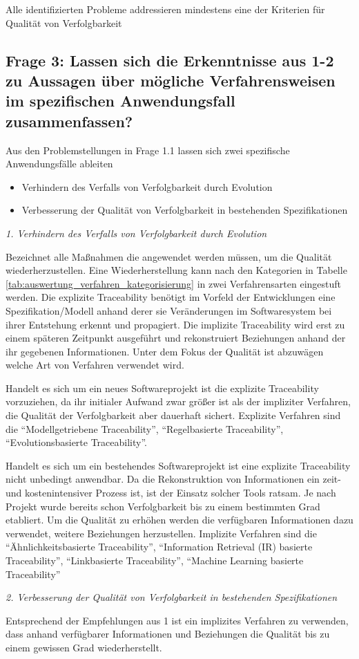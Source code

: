 Alle identifizierten Probleme addressieren mindestens eine der Kriterien für Qualität von Verfolgbarkeit

\subsection{Frage 3: Lassen sich die Erkenntnisse aus 1-2 zu Aussagen über mögliche Verfahrensweisen im spezifischen Anwendungsfall zusammenfassen?}

Aus den Problemstellungen in Frage 1.1 lassen sich zwei spezifische Anwendungsfälle ableiten

\begin{itemize}
    \item Verhindern des Verfalls von Verfolgbarkeit durch Evolution
    \item Verbesserung der Qualität von Verfolgbarkeit in bestehenden Spezifikationen
\end{itemize}

\textit{1. Verhindern des Verfalls von Verfolgbarkeit durch Evolution}

Bezeichnet alle Maßnahmen die angewendet werden müssen, um die Qualität wiederherzustellen. Eine Wiederherstellung kann nach den Kategorien in Tabelle \ref{tab:auswertung_verfahren_kategorisierung} in zwei Verfahrensarten eingestuft werden. Die explizite Traceability benötigt im Vorfeld der Entwicklungen eine Spezifikation/Modell anhand derer sie Veränderungen im Softwaresystem bei ihrer Entstehung erkennt und propagiert. Die implizite Traceability wird erst zu einem späteren Zeitpunkt ausgeführt und rekonstruiert Beziehungen anhand der ihr gegebenen Informationen. Unter dem Fokus der Qualität ist abzuwägen welche Art von Verfahren verwendet wird.

Handelt es sich um ein neues Softwareprojekt ist die explizite Traceability vorzuziehen, da ihr initialer Aufwand zwar größer ist als der impliziter Verfahren, die Qualität der Verfolgbarkeit aber dauerhaft sichert. Explizite Verfahren sind die \enquote{Modellgetriebene Traceability}, \enquote{Regelbasierte Traceability}, \enquote{Evolutionsbasierte Traceability}.

Handelt es sich um ein bestehendes Softwareprojekt ist eine explizite Traceability nicht unbedingt anwendbar. Da die Rekonstruktion von Informationen ein zeit- und kostenintensiver Prozess ist, ist der Einsatz solcher Tools ratsam. Je nach Projekt wurde bereits schon Verfolgbarkeit bis zu einem bestimmten Grad etabliert. Um die Qualität zu erhöhen werden die verfügbaren Informationen dazu verwendet, weitere Beziehungen herzustellen. Implizite Verfahren sind die \enquote{Ähnlichkeitsbasierte Traceability}, \enquote{Information Retrieval (IR) basierte Traceability}, \enquote{Linkbasierte Traceability}, \enquote{Machine Learning basierte Traceability}

\textit{2. Verbesserung der Qualität von Verfolgbarkeit in bestehenden Spezifikationen}

Entsprechend der Empfehlungen aus 1 ist ein implizites Verfahren zu verwenden, dass anhand verfügbarer Informationen und Beziehungen die Qualität bis zu einem gewissen Grad wiederherstellt.